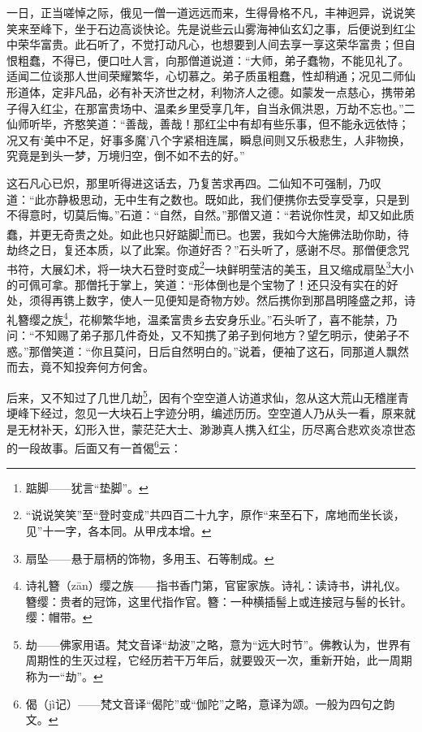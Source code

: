 \par 一日，正当嗟悼之际，俄见一僧一道远远而来，生得骨格不凡，丰神迥异，说说笑笑来至峰下，坐于石边高谈快论。先是说些云山雾海神仙玄幻之事，后便说到红尘中荣华富贵。此石听了，不觉打动凡心，也想要到人间去享一享这荣华富贵；但自恨粗蠢，不得已，便口吐人言，向那僧道说道：“大师，弟子蠢物，不能见礼了。适闻二位谈那人世间荣耀繁华，心切慕之。弟子质虽粗蠢，性却稍通；况见二师仙形道体，定非凡品，必有补天济世之材，利物济人之德。如蒙发一点慈心，携带弟子得入红尘，在那富贵场中、温柔乡里受享几年，自当永佩洪恩，万劫不忘也。”二仙师听毕，齐憨笑道：“善哉，善哉！那红尘中有却有些乐事，但不能永远依恃；况又有‘美中不足，好事多魔’八个字紧相连属，瞬息间则又乐极悲生，人非物换，究竟是到头一梦，万境归空，倒不如不去的好。”
\par 这石凡心已炽，那里听得进这话去，乃复苦求再四。二仙知不可强制，乃叹道：“此亦静极思动，无中生有之数也。既如此，我们便携你去受享受享，只是到不得意时，切莫后悔。”石道：“自然，自然。”那僧又道：“若说你性灵，却又如此质蠢，并更无奇贵之处。如此也只好踮脚\footnote{踮脚——犹言“垫脚”。}而已。也罢，我如今大施佛法助你助，待劫终之日，复还本质，以了此案。你道好否？”石头听了，感谢不尽。那僧便念咒书符，大展幻术，将一块大石登时变成\footnote{ “说说笑笑”至“登时变成”共四百二十九字，原作“来至石下，席地而坐长谈，见”十一字，各本同。从甲戌本增。}一块鲜明莹洁的美玉，且又缩成扇坠\footnote{扇坠——悬于扇柄的饰物，多用玉、石等制成。}大小的可佩可拿。那僧托于掌上，笑道：“形体倒也是个宝物了！还只没有实在的好处，须得再镌上数字，使人一见便知是奇物方妙。然后携你到那昌明隆盛之邦，诗礼簪缨之族\footnote{诗礼簪（zān）缨之族——指书香门第，官宦家族。诗礼：读诗书，讲礼仪。簪缨：贵者的冠饰，这里代指作官。簪：一种横插髻上或连接冠与髻的长针。缨：帽带。}，花柳繁华地，温柔富贵乡去安身乐业。”石头听了，喜不能禁，乃问：“不知赐了弟子那几件奇处，又不知携了弟子到何地方？望乞明示，使弟子不惑。”那僧笑道：“你且莫问，日后自然明白的。”说着，便袖了这石，同那道人飘然而去，竟不知投奔何方何舍。
\par 后来，又不知过了几世几劫\footnote{劫——佛家用语。梵文音译“劫波”之略，意为“远大时节”。佛教认为，世界有周期性的生灭过程，它经历若干万年后，就要毁灭一次，重新开始，此一周期称为一“劫”。}，因有个空空道人访道求仙，忽从这大荒山无稽崖青埂峰下经过，忽见一大块石上字迹分明，编述历历。空空道人乃从头一看，原来就是无材补天，幻形入世，蒙茫茫大士、渺渺真人携入红尘，历尽离合悲欢炎凉世态的一段故事。后面又有一首偈\footnote{偈（jì记）——梵文音译“偈陀”或“伽陀”之略，意译为颂。一般为四句之韵文。}云：

